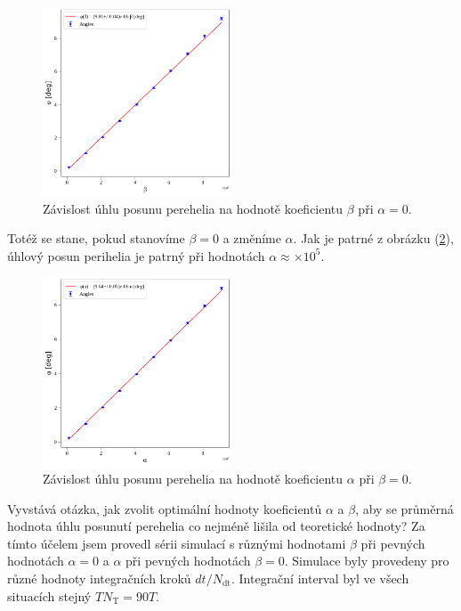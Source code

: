 \documentclass[a4paper,11pt,twocolumn]{article}
\begin{document}
            \begin{figure}
                \centering
                \includegraphics[width=0.5\textwidth]{phi_alpha.png}
                \caption{Závislost úhlu posunu perehelia na hodnotě koeficientu $\beta$ při $\alpha = 0$.}
                \label{fig:phi_alpha}
            \end{figure}

            Totéž se stane, pokud stanovíme $\beta = 0$ a změníme $\alpha$. Jak je patrné z obrázku (\ref{fig:phi_beta}), úhlový posun perihelia je patrný při hodnotách $\alpha \approx \times 10^5$.

            \begin{figure}
                \centering
                \includegraphics[width=0.5\textwidth]{phi_beta.png}
                \caption{Závislost úhlu posunu perehelia na hodnotě koeficientu $\alpha$ při $\beta = 0$.}
                \label{fig:phi_beta}
            \end{figure}

            Vyvstává otázka, jak zvolit optimální hodnoty koeficientů $\alpha$ a $\beta$, aby se průměrná hodnota úhlu posunutí perehelia co nejméně lišila od teoretické hodnoty? Za tímto účelem jsem provedl sérii simulací s různými hodnotami $\beta$ při pevných hodnotách $\alpha = 0$ a $\alpha$ při pevných hodnotách $\beta = 0$. Simulace byly provedeny pro různé hodnoty integračních kroků $dt/N_{\text{dt}}$. Integrační interval byl ve všech situacích stejný $TN_{\text{T}} = 90T$.  
            
\end{document}
